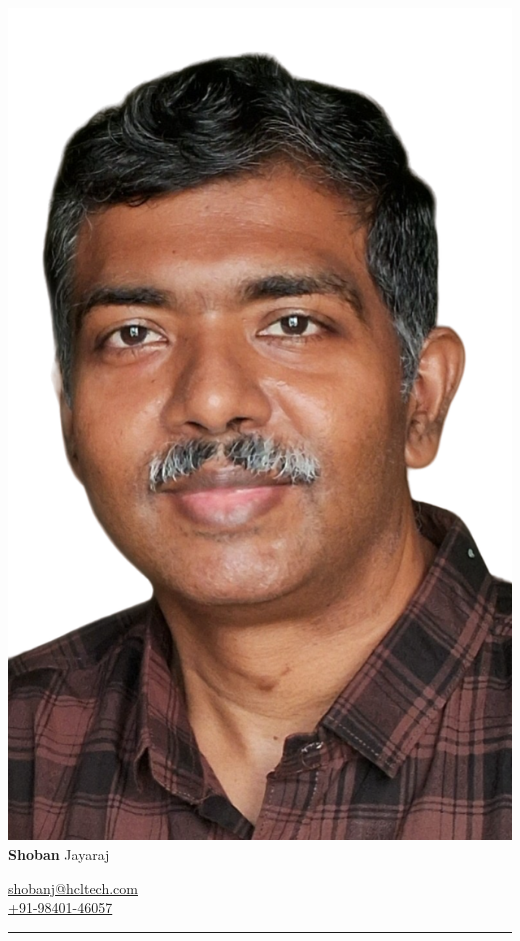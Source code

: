 \documentclass[a4paper,12pt]{article}
\newcommand\cvtitle[2]{\Huge{\bf{#1}} \Huge{#2}}
\newcommand\cvcontact[3] {
  \small {
    \faAt \quad \href{mailto:#1}{#1} \\
    \faPhone \quad \href{tel:#2}{#2} \\
    {\href{https://www.linkedin.com/in/#3/}{\faLinkedin}}
    {\href{https://github.com/#3}{\faGithub}}
    {\href{https://#3.wordpress.com/}{\faWordpress}}
  }
}
\newcommand\cvhrule{{\color{gray}\hrule}}
\begin{document}
\begin{minipage}[b]{.7\linewidth}
  \includegraphics[height=3\baselineskip]{me}
  \cvtitle{Shoban}{Jayaraj}
\end{minipage}
\begin{minipage}[b]{.3\linewidth}
  \cvcontact{shobanj@hcltech.com}{+91-98401-46057}{shobanj}
\end{minipage}

\cvhrule
\end{document}
